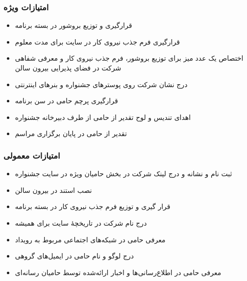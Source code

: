 \documentclass{article}
\begin{document}
\subsubsection{امتیازات ویژه}

\begin{flushright}
\begin{itemize}
\item قرارگیری و توزیع بروشور در بسته برنامه
\item قرارگیری فرم جذب نیروی کار در سایت برای مدت معلوم
\item اختصاص یک عدد میز برای توزیع بروشور، فرم جذب نیروی کار و معرفی شفاهی شرکت در فضای پذیرایی بیرون سالن
\item درج نشان شرکت روی پوسترهای جشنواره و بنرهای اینترنتی
\item قرارگیری پرچم حامی در سن برنامه
\item اهدای تندیس و لوح تقدیر از حامی از طرف دبیرخانه جشنواره
\item تقدیر از حامی در پایان برگزاری مراسم
\end{itemize}
\end{flushright}

\subsubsection{امتیازات معمولی}
\begin{flushright}


\begin{itemize}
\item ثبت نام و نشانه و درج لینک شرکت در بخش حامیان ویژه در سایت جشنواره
\item نصب استند در بیرون سالن
\item قرار گیری و توزیع فرم جذب نیروی کار در بسته برنامه
\item درج نام شرکت در تاریخچهٔ سایت برای همیشه
\item معرفی حامی در شبکه‌های اجتماعی مربوط به رویداد
\item درج لوگو و نام حامی در ایمیل‌های گروهی
\item معرفی حامی در اطلاع‌رسانی‌ها و اخبار ارائه‌شده توسط حامیان رسانه‌ای
\end{itemize}
\end{flushright}
\end{document}
